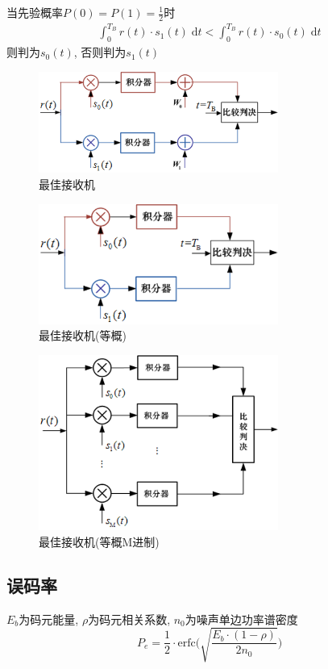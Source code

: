 \documentclass[a4paper]{report}
\begin{document}
当先验概率$P(0)=P(1)=\frac{1}{2}$时
\begin{align}
  \int_0^{T_B} r(t)\cdot s_1(t) \; \text{d}t<
  \int_0^{T_B} r(t)\cdot s_0(t) \; \text{d}t
\end{align}
则判为$s_0(t)$, 否则判为$s_1(t)$
\begin{figure}[H]
\centering
\includegraphics[width=0.7\textwidth]{opt_rx_1.png}
\caption{最佳接收机}
\end{figure}
\begin{figure}[H]
\centering
\includegraphics[width=0.7\textwidth]{opt_rx_2.png}
\caption{最佳接收机(等概)}
\end{figure}
\begin{figure}[H]
\centering
\includegraphics[width=0.7\textwidth]{opt_rx_3.png}
\caption{最佳接收机(等概M进制)}
\end{figure}
\subsection{误码率}
$E_b$为码元能量, $\rho$为码元相关系数, $n_0$为噪声单边功率谱密度
\begin{equation}
  P_e=\frac{1}{2}\cdot \text{erfc}\bigg(\sqrt{\frac{E_b\cdot (1-\rho)}{2n_0}}\bigg)
\end{equation}
\end{document}
